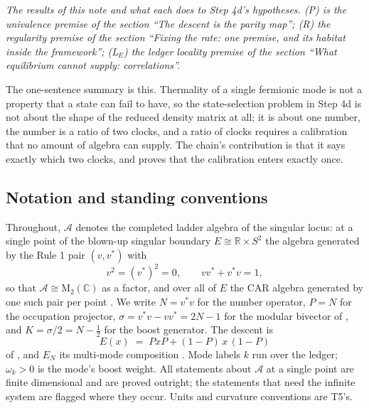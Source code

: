 \documentclass[11pt]{article}
\theoremstyle{definition}
\theoremstyle{plain}
\providecommand{\Aa}{}\renewcommand{\Aa}{\mathcal{A}}
\providecommand{\C}{}\renewcommand{\C}{\mathbb{C}}
\providecommand{\EN}{}\renewcommand{\EN}{E_{N}}
\providecommand{\Mat}{}\renewcommand{\Mat}{\mathrm{M}}
\providecommand{\R}{}\renewcommand{\R}{\mathbb{R}}
\begin{document}
\emph{The results of this note and what each does to Step 4d's hypotheses. (P) is the univalence premise of the section ``The descent is the parity map''; (R) the regularity premise of the section ``Fixing the rate: one premise, and its habitat inside the framework''; (L$_E$) the ledger locality premise of the section ``What equilibrium cannot supply: correlations''.}

The one-sentence summary is this. Thermality of a single fermionic mode is not a property that a state can fail to have, so the state-selection problem in Step 4d is not about the shape of the reduced density matrix at all; it is about one number, the number is a ratio of two clocks, and a ratio of clocks requires a calibration that no amount of algebra can supply. The chain's contribution is that it says exactly which two clocks, and proves that the calibration enters exactly once.

\subsection*{Notation and standing conventions}
\label{c:note.state-selection.setting-notation-standing-conventions}
Throughout, $\Aa$ denotes the completed ladder algebra of the singular locus: at a single point of the blown-up singular boundary $E \cong \R \times S^{2}$ the algebra generated by the Rule 1 pair $(v, v^{*})$ with
\begin{equation}
v^{2} = (v^{*})^{2} = 0, \qquad v v^{*} + v^{*} v = 1 ,
\end{equation}
so that $\Aa \cong \Mat_2(\C)$ as a factor, and over all of $E$ the CAR algebra generated by one such pair per point \cite[Thm.~8.7, Thm.~8.12]{ButlerT4}. We write $N = v^{*}v$ for the number operator, $P = N$ for the occupation projector, $\sigma = v^{*}v - vv^{*} = 2N - 1$ for the modular bivector of \cite[Thm.~6.3]{ButlerT5}, and $K = \sigma/2 = N - \tfrac12$ for the boost generator. The descent is
\begin{equation}
E(x) \;=\; PxP + (1-P)\,x\,(1-P)
\end{equation}
of \cite[Prop.~5.5]{ButlerT5}, and $\EN$ its multi-mode composition \cite[Def.~9.1]{ButlerT5}. Mode labels $k$ run over the ledger; $\omega_k > 0$ is the mode's boost weight. All statements about $\Aa$ at a single point are finite dimensional and are proved outright; the statements that need the infinite system are flagged where they occur. Units and curvature conventions are T5's.
\end{document}

